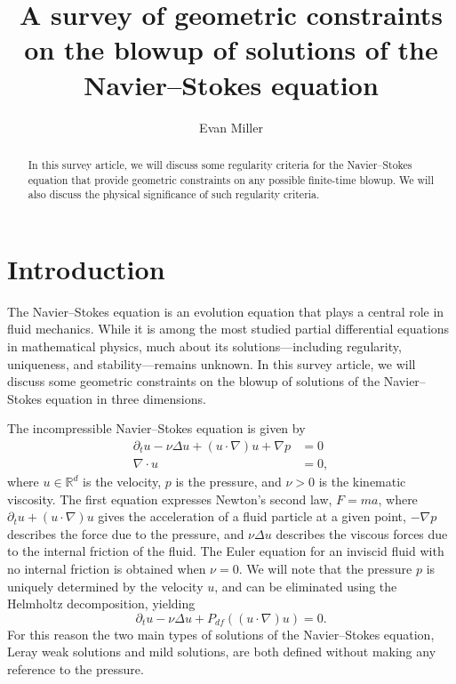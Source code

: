 \documentclass[11pt]{article}
\title{A survey of geometric constraints on the blowup of solutions of the Navier--Stokes equation}
\author[1]{Evan Miller}
\affil[1]{University of British Columbia, Department of Mathematics

emiller@msri.org}
\theoremstyle{plain}
\theoremstyle{remark}
\numberwithin{equation}{section}
\begin{document}
\maketitle

\begin{abstract}
In this survey article, we will discuss some regularity criteria for the Navier--Stokes equation that provide geometric constraints on any possible finite-time blowup. We will also discuss the physical significance of such regularity criteria.
\end{abstract}

\section{Introduction}

The Navier--Stokes equation is an evolution equation that plays a central role in fluid mechanics. While it is among the most studied partial differential equations in mathematical physics, much about its solutions---including regularity, uniqueness, and stability---remains unknown. In this survey article, we will discuss some geometric constraints on the blowup of solutions of the Navier--Stokes equation in three dimensions. 

The incompressible Navier--Stokes equation is given by
\begin{align}
    \partial_t u-\nu\Delta u+(u\cdot \nabla)u
    +\nabla p&=0 \\
    \nabla \cdot u&=0,
\end{align}
where $u\in\mathbb{R}^d$ is the velocity, $p$ is the pressure, and $\nu>0$ is the kinematic viscosity. 
The first equation expresses Newton's second law, $F=ma$, where $\partial_t u+(u\cdot\nabla)u$ gives the acceleration of a fluid particle at a given point, $-\nabla p$ describes the force due to the pressure, and $\nu\Delta u$ describes the viscous forces due to the internal friction of the fluid. 
The Euler equation for an inviscid fluid with no internal friction is obtained when $\nu=0$.
We will note that the pressure $p$ is uniquely determined by the velocity $u$, and can be eliminated using the Helmholtz decomposition, yielding
\begin{equation}
    \partial_t u-\nu\Delta u
    +P_{df}\left((u\cdot \nabla)u\right)=0.
\end{equation}
For this reason the two main types of solutions of the Navier--Stokes equation, Leray weak solutions and mild solutions, are both defined without making any reference to the pressure.
\end{document}
